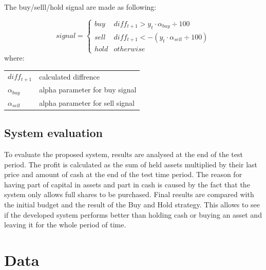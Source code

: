 \documentclass[review]{elsarticle} %
\makeatletter
\newenvironment{conditions}
{\par\vspace{\abovedisplayskip}\noindent\begin{tabular}{>{$}l<{$} @{${}={}$} l}}
       {\end{tabular}\par\vspace{\belowdisplayskip}}
\makeatother
\begin{document}
 \begin{flushleft} The buy/selll/hold signal are made as following: \end{flushleft} 
\begin{equation}
signal =  \left\{\begin{array}{ll} buy & diff_{t+1} >  y_{t} \cdot  \alpha_{buy} \div 100 \\ sell & diff_{t+1} <  -(y_{t} \cdot  \alpha_{sell} \div 100)\\  hold & otherwise \end{array}\right.
\end{equation}
where:
\begin{conditions}
diff_{t+1} & calculated diffrence \\ 
\alpha_{buy}     &  alpha parameter for buy signal \\   
\alpha_{sell}     &  alpha parameter for sell signal\\   
\end{conditions}

\subsection{System evaluation}
To evaluate the proposed system, results are analysed at the end of the test period. The profit is calculated as the sum of held assets multiplied by their last price and amount of cash at the end of the test time period. The reason for having part of capital in assets and part in cash is caused by the fact that the  system only allows full shares to be purchased. Final results are compared with the initial budget and the result of the Buy and Hold strategy. This allows to see if the developed system performs better than holding cash or buying an asset and leaving it for the whole period of time. 

\section{Data}
\end{document}
